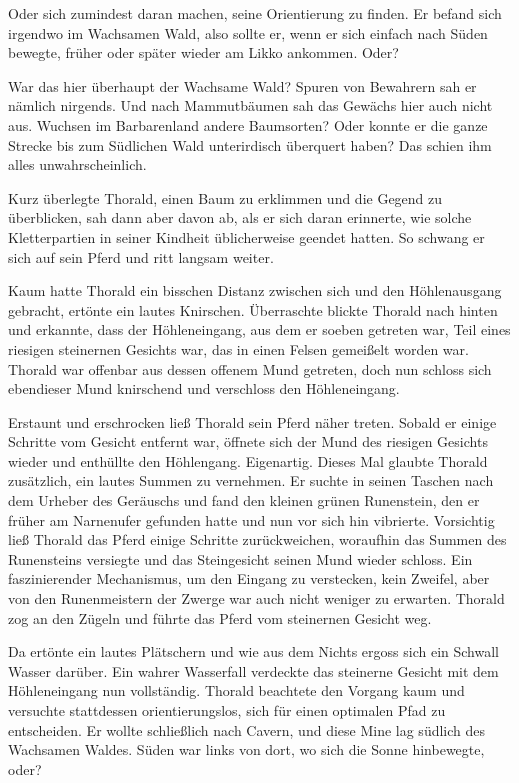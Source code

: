 Oder sich zumindest daran machen, seine Orientierung zu finden. Er befand sich irgendwo im Wachsamen Wald, also sollte er, wenn er sich einfach nach Süden bewegte, früher oder später wieder am Likko ankommen. Oder?

War das hier überhaupt der Wachsame Wald? Spuren von Bewahrern sah er nämlich nirgends. Und nach Mammutbäumen sah das Gewächs hier auch nicht aus. Wuchsen im Barbarenland andere Baumsorten? Oder konnte er die ganze Strecke bis zum Südlichen Wald unterirdisch überquert haben? Das schien ihm alles unwahrscheinlich.

Kurz überlegte Thorald, einen Baum zu erklimmen und die Gegend zu überblicken, sah dann aber davon ab, als er sich daran erinnerte, wie solche Kletterpartien in seiner Kindheit üblicherweise geendet hatten. So schwang er sich auf sein Pferd und ritt langsam weiter.

Kaum hatte Thorald ein bisschen Distanz zwischen sich und den Höhlenausgang gebracht, ertönte ein lautes Knirschen. Überraschte blickte Thorald nach hinten und erkannte, dass der Höhleneingang, aus dem er soeben getreten war, Teil eines riesigen steinernen Gesichts war, das in einen Felsen gemeißelt worden war. Thorald war offenbar aus dessen offenem Mund getreten, doch nun schloss sich ebendieser Mund knirschend und verschloss den Höhleneingang.

Erstaunt und erschrocken ließ Thorald sein Pferd näher treten. Sobald er einige Schritte vom Gesicht entfernt war, öffnete sich der Mund des riesigen Gesichts wieder und enthüllte den Höhlengang. Eigenartig. Dieses Mal glaubte Thorald zusätzlich, ein lautes Summen zu vernehmen. Er suchte in seinen Taschen nach dem Urheber des Geräuschs und fand den kleinen grünen Runenstein, den er früher am Narnenufer gefunden hatte und nun vor sich hin vibrierte. Vorsichtig ließ Thorald das Pferd einige Schritte zurückweichen, woraufhin das Summen des Runensteins versiegte und das Steingesicht seinen Mund wieder schloss. Ein faszinierender Mechanismus, um den Eingang zu verstecken, kein Zweifel, aber von den Runenmeistern der Zwerge war auch nicht weniger zu erwarten. Thorald zog an den Zügeln und führte das Pferd vom steinernen Gesicht weg.

Da ertönte ein lautes Plätschern und wie aus dem Nichts ergoss sich ein Schwall Wasser darüber. Ein wahrer Wasserfall verdeckte das steinerne Gesicht mit dem Höhleneingang nun vollständig. Thorald beachtete den Vorgang kaum und versuchte stattdessen orientierungslos, sich für einen optimalen Pfad zu entscheiden. Er wollte schließlich nach Cavern, und diese Mine lag südlich des Wachsamen Waldes. Süden war links von dort, wo sich die Sonne hinbewegte, oder?



